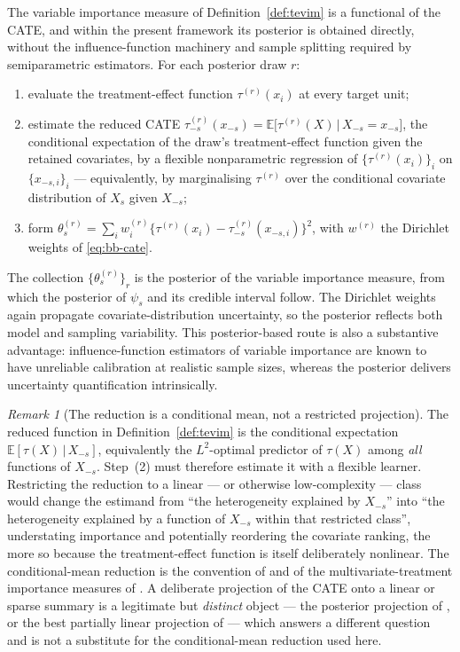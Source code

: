 \documentclass[11pt]{report}
\theoremstyle{plain}
\theoremstyle{definition}
\theoremstyle{remark}
\newcommand{\E}{\mathbb{E}}
\newcommand{\1}{\mathds{1}}
\theoremstyle{plain}
\theoremstyle{remark}
\newtheorem{remark}[theorem]{Remark}
\newcommand{\given}{\,\vert\,}
\begin{document}
The variable importance measure of Definition~\ref{def:tevim} is a functional of
the CATE, and within the present framework its posterior is obtained directly,
without the influence-function machinery and sample splitting required by
semiparametric estimators. For each posterior draw $r$:
\begin{enumerate}[label=\textup{(\arabic*)},leftmargin=2.4em]
\item evaluate the treatment-effect function $\tau^{(r)}(x_i)$ at every target
      unit;
\item estimate the reduced CATE $\tau^{(r)}_{-s}(x_{-s}) =
      \E\bigl[\tau^{(r)}(X) \given X_{-s} = x_{-s}\bigr]$, the conditional
      expectation of the draw's treatment-effect function given the retained
      covariates, by a flexible nonparametric regression of
      $\{\tau^{(r)}(x_i)\}_i$ on $\{x_{-s,i}\}_i$ --- equivalently, by
      marginalising $\tau^{(r)}$ over the conditional covariate distribution of
      $X_s$ given $X_{-s}$;
\item form
      $\theta_s^{(r)} = \sum_i w_i^{(r)}
      \bigl\{\tau^{(r)}(x_i) - \tau^{(r)}_{-s}(x_{-s,i})\bigr\}^2$,
      with $w^{(r)}$ the Dirichlet weights of \eqref{eq:bb-cate}.
\end{enumerate}
The collection $\{\theta_s^{(r)}\}_r$ is the posterior of the variable
importance measure, from which the posterior of $\psi_s$ and its credible
interval follow. The Dirichlet weights again propagate covariate-distribution
uncertainty, so the posterior reflects both model and sampling variability. This
posterior-based route is also a substantive advantage: influence-function
estimators of variable importance are known to have unreliable calibration at
realistic sample sizes, whereas the posterior delivers uncertainty
quantification intrinsically.

\begin{remark}[The reduction is a conditional mean, not a restricted projection]
\label{rem:cond-mean}
The reduced function in Definition~\ref{def:tevim} is the conditional
expectation $\E[\tau(X) \given X_{-s}]$, equivalently the $L^2$-optimal
predictor of $\tau(X)$ among \emph{all} functions of $X_{-s}$. Step~(2) must
therefore estimate it with a flexible learner. Restricting the reduction to a
linear --- or otherwise low-complexity --- class would change the estimand from
``the heterogeneity explained by $X_{-s}$'' into ``the heterogeneity explained
by a function of $X_{-s}$ within that restricted class'', understating
importance and potentially reordering the covariate ranking, the more so because
the treatment-effect function is itself deliberately nonlinear. The
conditional-mean reduction is the convention of \citet{hines2022} and of the
multivariate-treatment importance measures of \citet{shin2024}. A deliberate
projection of the CATE onto a linear or sparse summary is a legitimate but
\emph{distinct} object --- the posterior projection of \citet{Woody2020}, or the
best partially linear projection of \citet{ziersen2024} --- which answers a
different question and is not a substitute for the conditional-mean reduction
used here.
\end{remark}
\end{document}
